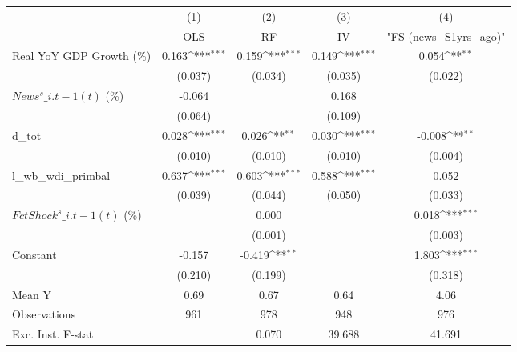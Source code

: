 {
\def\sym#1{\ifmmode^{#1}\else\(^{#1}\)\fi}
\begin{tabular}{l*{4}{c}}
\toprule
                    &\multicolumn{1}{c}{(1)}&\multicolumn{1}{c}{(2)}&\multicolumn{1}{c}{(3)}&\multicolumn{1}{c}{(4)}\\
                    &\multicolumn{1}{c}{OLS}&\multicolumn{1}{c}{RF}&\multicolumn{1}{c}{IV}&\multicolumn{1}{c}{ "FS (news\_S1yrs\_ago)" }\\
\midrule
Real YoY GDP Growth (\%)&       0.163\sym{***}&       0.159\sym{***}&       0.149\sym{***}&       0.054\sym{**} \\
                    &     (0.037)         &     (0.034)         &     (0.035)         &     (0.022)         \\
\addlinespace
$ News^s\_{i.t-1}(t)$ (\%)&      -0.064         &                     &       0.168         &                     \\
                    &     (0.064)         &                     &     (0.109)         &                     \\
\addlinespace
d\_tot               &       0.028\sym{***}&       0.026\sym{**} &       0.030\sym{***}&      -0.008\sym{**} \\
                    &     (0.010)         &     (0.010)         &     (0.010)         &     (0.004)         \\
\addlinespace
l\_wb\_wdi\_primbal    &       0.637\sym{***}&       0.603\sym{***}&       0.588\sym{***}&       0.052         \\
                    &     (0.039)         &     (0.044)         &     (0.050)         &     (0.033)         \\
\addlinespace
$ FctShock^s\_{i.t-1}(t)$ (\%)&                     &       0.000         &                     &       0.018\sym{***}\\
                    &                     &     (0.001)         &                     &     (0.003)         \\
\addlinespace
Constant            &      -0.157         &      -0.419\sym{**} &                     &       1.803\sym{***}\\
                    &     (0.210)         &     (0.199)         &                     &     (0.318)         \\
\midrule
Mean Y              &        0.69         &        0.67         &        0.64         &        4.06         \\
Observations        &         961         &         978         &         948         &         976         \\
Exc. Inst. F-stat   &                     &       0.070         &      39.688         &      41.691         \\
\bottomrule
\end{tabular}
}
